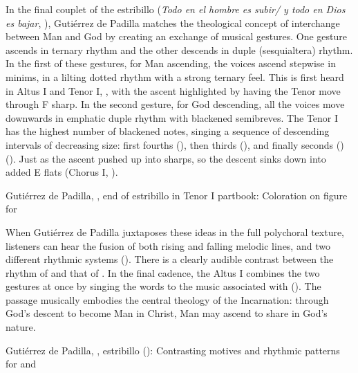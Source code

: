 In the final couplet of the estribillo (\emph{Todo en el hombre es subir/ y todo
en Dios es bajar}, ), Gutiérrez de Padilla matches the
theological concept of interchange between Man and God by creating an exchange
of musical gestures.
One gesture ascends in ternary rhythm and the other descends in duple
(sesquialtera) rhythm.
In the first of these gestures, for Man ascending, the voices ascend stepwise in
minims, in a lilting dotted rhythm with a strong ternary feel.
This is first heard in Altus I and Tenor I, , with the ascent
highlighted by having the Tenor move through F sharp.
In the second gesture, for God descending, all the voices move downwards in
emphatic duple rhythm with blackened semibreves.
The Tenor I has the highest number of blackened notes, singing a sequence of
descending intervals of decreasing size: first fourths (),
then thirds (), and finally seconds ()
().
Just as the ascent pushed up into sharps, so the descent sinks down into added E
flats (Chorus I, ).

{Gutiérrez de Padilla, , end of estribillo in
Tenor I partbook: Coloration on figure for }

When Gutiérrez de Padilla juxtaposes these ideas in the full polychoral texture,
listeners can hear the fusion of both rising and falling melodic lines, and two
different rhythmic systems ().
There is a clearly audible contrast between the rhythm of  and that of .
In the final cadence, the Altus I combines the two gestures at once by singing
the words  to the music associated with
 ().
The passage musically embodies the central theology of the Incarnation: through
God's descent to become Man in Christ, Man may ascend to share in God's nature.

{Gutiérrez de Padilla, , estribillo
(): Contrasting motives and rhythmic patterns for  and }

